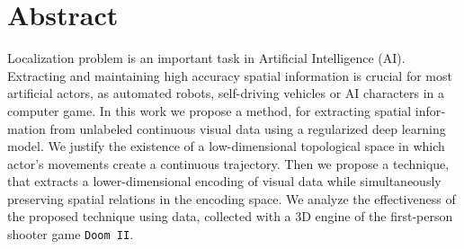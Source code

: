 
\chapter{Abstract}

\begin{english}

Localization problem is an important task in Artificial Intelligence (AI).
Extracting and maintaining high accuracy spatial information is crucial for most artificial actors, as automated robots, self-driving vehicles or AI characters in a computer game.
In this work we propose a method, for extracting spatial information from unlabeled continuous visual data using a regularized deep learning model.
We justify the existence of a low-dimensional topological space in which actor's movements create a continuous trajectory.
Then we propose a technique, that extracts a lower-dimensional encoding of visual data while simultaneously preserving spatial relations in the encoding space.
We analyze the effectiveness of the proposed technique using data, collected with a 3D engine of the first-person shooter game \texttt{Doom II}.

\end{english}

